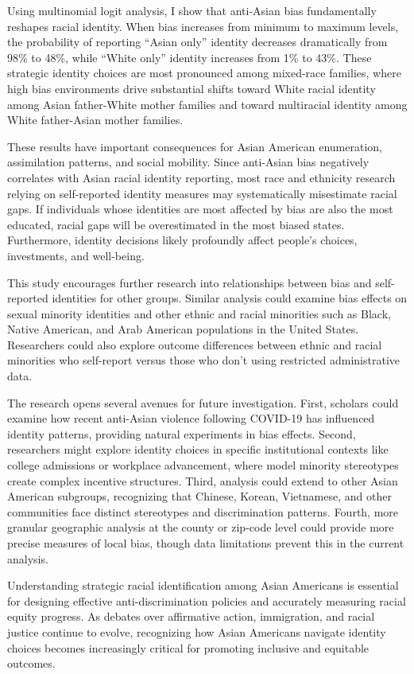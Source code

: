 Using multinomial logit analysis, I show that anti-Asian bias fundamentally reshapes racial identity. When bias increases from minimum to maximum levels, the probability of reporting ``Asian only'' identity decreases dramatically from 98\% to 48\%, while ``White only'' identity increases from 1\% to 43\%. These strategic identity choices are most pronounced among mixed-race families, where high bias environments drive substantial shifts toward White racial identity among Asian father-White mother families and toward multiracial identity among White father-Asian mother families.

These results have important consequences for Asian American enumeration, assimilation patterns, and social mobility. Since anti-Asian bias negatively correlates with Asian racial identity reporting, most race and ethnicity research relying on self-reported identity measures may systematically misestimate racial gaps. If individuals whose identities are most affected by bias are also the most educated, racial gaps will be overestimated in the most biased states. Furthermore, identity decisions likely profoundly affect people's choices, investments, and well-being.

This study encourages further research into relationships between bias and self-reported identities for other groups. Similar analysis could examine bias effects on sexual minority identities and other ethnic and racial minorities such as Black, Native American, and Arab American populations in the United States. Researchers could also explore outcome differences between ethnic and racial minorities who self-report versus those who don't using restricted administrative data.

The research opens several avenues for future investigation. First, scholars could examine how recent anti-Asian violence following COVID-19 has influenced identity patterns, providing natural experiments in bias effects. Second, researchers might explore identity choices in specific institutional contexts like college admissions or workplace advancement, where model minority stereotypes create complex incentive structures. Third, analysis could extend to other Asian American subgroups, recognizing that Chinese, Korean, Vietnamese, and other communities face distinct stereotypes and discrimination patterns. Fourth, more granular geographic analysis at the county or zip-code level could provide more precise measures of local bias, though data limitations prevent this in the current analysis.

Understanding strategic racial identification among Asian Americans is essential for designing effective anti-discrimination policies and accurately measuring racial equity progress. As debates over affirmative action, immigration, and racial justice continue to evolve, recognizing how Asian Americans navigate identity choices becomes increasingly critical for promoting inclusive and equitable outcomes.